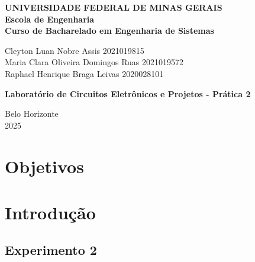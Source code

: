 \documentclass[
	12pt,				%
	oneside,			%
	a4paper,			%
	chapter=TITLE,
	sumario=tradicional,
	english,			%
	brazil				%
]{abntex2}
\begin{document}

\frenchspacing 

\begin{center}
\textbf{UNIVERSIDADE FEDERAL DE MINAS GERAIS\\
Escola de Engenharia \\
Curso de Bacharelado em Engenharia de Sistemas}

\vspace{4cm}

Cleyton Luan Nobre Assis 2021019815 \\
Maria Clara Oliveira Domingos Ruas 2021019572 \\
Raphael Henrique Braga Leivas 2020028101

\vspace{4cm}  

{ \textbf{Laboratório de Circuitos Eletrônicos e Projetos - Prática 2} }

\vfill
{Belo Horizonte \\
2025 }
\end{center}

\newpage

\tableofcontents*
\cleardoublepage

\textual

\pagestyle{simple}
	
\chapter{Objetivos}\label{cap:objetivos} 

\lipsum[1-2]

\chapter{Introdução}\label{cap:introdução} 

\lipsum[1-2]

\section{Experimento 2}
\end{document}
